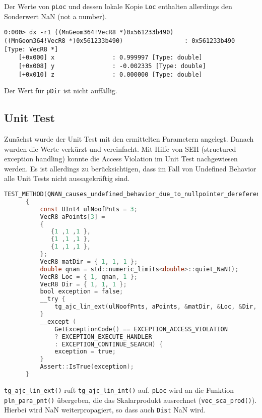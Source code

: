Der Werte von \verb|pLoc| und dessen lokale Kopie \verb|Loc| enthalten allerdings den Sonderwert NaN (not a number).

\begin{lstlisting}
0:000> dx -r1 ((MnGeom364!VecR8 *)0x561233b490)
((MnGeom364!VecR8 *)0x561233b490)                 : 0x561233b490 [Type: VecR8 *]
    [+0x000] x                : 0.999997 [Type: double]
    [+0x008] y                : -0.002335 [Type: double]
    [+0x010] z                : 0.000000 [Type: double]
\end{lstlisting}

Der Wert für \verb|pDir| ist nicht auffällig.

\subsection{Unit Test}

Zunächst wurde der Unit Test mit den ermittelten Parametern angelegt. Danach wurden die Werte verkürzt und vereinfacht.
Mit Hilfe von SEH (structured exception handling) konnte die Access Violation im Unit Test nachgewiesen werden.
Es ist allerdings zu berücksichtigen, dass im Fall von Undefined Behavior alle Unit Tests nicht aussagekräftig sind.

\begin{lstlisting}[language=C]
      TEST_METHOD(QNAN_causes_undefined_behavior_due_to_nullpointer_dereferencing)
      {
          const UInt4 ulNoofPnts = 3;
          VecR8 aPoints[3] =
          {
             {1 ,1 ,1 },
             {1 ,1 ,1 },
             {1 ,1 ,1 },
          };
          VecR8 matDir = { 1, 1, 1 };
          double qnan = std::numeric_limits<double>::quiet_NaN();
          VecR8 Loc = { 1, qnan, 1 };
          VecR8 Dir = { 1, 1, 1 };
          bool exception = false;
          __try {
              tg_ajc_lin_ext(ulNoofPnts, aPoints, &matDir, &Loc, &Dir, True, True);
          }
          __except (
              GetExceptionCode() == EXCEPTION_ACCESS_VIOLATION
              ? EXCEPTION_EXECUTE_HANDLER
              : EXCEPTION_CONTINUE_SEARCH) {
              exception = true;
          }
          Assert::IsTrue(exception);
      }
\end{lstlisting}

\verb|tg_ajc_lin_ext()| ruft \verb|tg_ajc_lin_int()| auf. \verb|pLoc| wird an die Funktion \verb|pln_para_pnt()| übergeben, die das Skalarprodukt ausrechnet (\verb|vec_sca_prod()|).
Hierbei wird NaN weiterpropagiert, so dass auch \verb|Dist| NaN wird.

